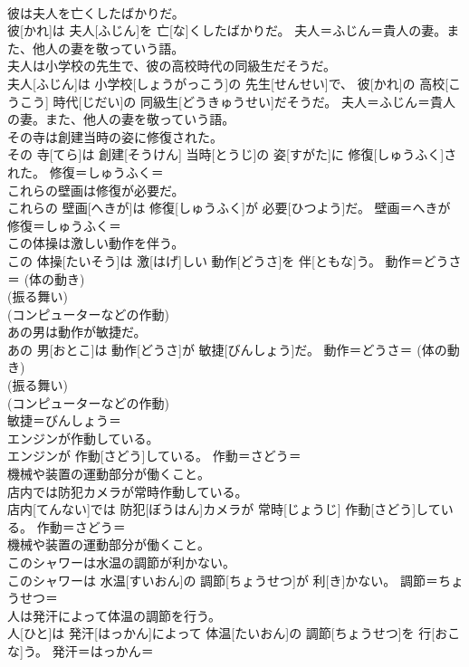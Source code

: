 \documentclass[8pt]{extreport}
\begin{document}
\begin{CJK}{UTF8}{min}
{\\	彼は夫人を亡くしたばかりだ。	
\\	彼[かれ]は 夫人[ふじん]を 亡[な]くしたばかりだ。	夫人＝ふじん＝貴人の妻。また、他人の妻を敬っていう語。
\\	夫人は小学校の先生で、彼の高校時代の同級生だそうだ。	
\\	夫人[ふじん]は 小学校[しょうがっこう]の 先生[せんせい]で、 彼[かれ]の 高校[こうこう] 時代[じだい]の 同級生[どうきゅうせい]だそうだ。	夫人＝ふじん＝貴人の妻。また、他人の妻を敬っていう語。
\\	その寺は創建当時の姿に修復された。	
\\	その 寺[てら]は 創建[そうけん] 当時[とうじ]の 姿[すがた]に 修復[しゅうふく]された。	修復＝しゅうふく＝ 
\\	これらの壁画は修復が必要だ。	
\\	これらの 壁画[へきが]は 修復[しゅうふく]が 必要[ひつよう]だ。	壁画＝へきが 修復＝しゅうふく＝ 
\\	この体操は激しい動作を伴う。	
\\	この 体操[たいそう]は 激[はげ]しい 動作[どうさ]を 伴[ともな]う。	動作＝どうさ＝ (体の動き) 
\\	(振る舞い) 
\\	(コンピューターなどの作動) 
\\	あの男は動作が敏捷だ。	
\\	あの 男[おとこ]は 動作[どうさ]が 敏捷[びんしょう]だ。	動作＝どうさ＝ (体の動き) 
\\	(振る舞い) 
\\	(コンピューターなどの作動) 
\\	敏捷＝びんしょう＝ 
\\	エンジンが作動している。	
\\	エンジンが 作動[さどう]している。	作動＝さどう＝ 
\\	機械や装置の運動部分が働くこと。
\\	店内では防犯カメラが常時作動している。	
\\	店内[てんない]では 防犯[ぼうはん]カメラが 常時[じょうじ] 作動[さどう]している。	作動＝さどう＝ 
\\	機械や装置の運動部分が働くこと。
\\	このシャワーは水温の調節が利かない。	
\\	このシャワーは 水温[すいおん]の 調節[ちょうせつ]が 利[き]かない。	調節＝ちょうせつ＝ 
\\	人は発汗によって体温の調節を行う。	
\\	人[ひと]は 発汗[はっかん]によって 体温[たいおん]の 調節[ちょうせつ]を 行[おこな]う。	発汗＝はっかん＝ 
}
\end{CJK}
\end{document}
